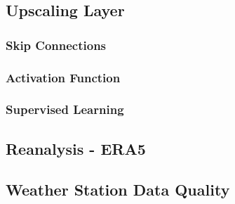 \subsection{Upscaling Layer}

\subsubsection*{Skip Connections}

\subsubsection*{Activation Function}

\subsubsection*{Supervised Learning}

\subsection{Reanalysis - ERA5}

\subsection{Weather Station Data Quality}